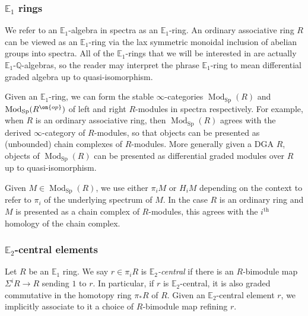 \documentclass[12 pt]{amsart}
\theoremstyle{plain}
\theoremstyle{definition}
\theoremstyle{remark}
\numberwithin{equation}{section}
\DeclareMathOperator\Sp{Sp}
\DeclareMathOperator\Pro{Pro}
\DeclareMathOperator\Mod{Mod}
\newcommand\QQ{\mathbb{Q}}
\newcommand\ZZ{\mathbb{Z}}
\newcommand\EE{\mathbb{E}}
\begin{document}
\subsubsection{$\EE_1$ rings}
We refer to an $\EE_1$-algebra in spectra as an $\EE_1$-ring. An ordinary associative ring $R$ can be viewed as an $\EE_1$-ring via the lax symmetric monoidal inclusion of abelian groups into spectra. All of the $\EE_1$-rings that we will be interested in are actually $\EE_1$-$\QQ$-algebras, so the reader may interpret the phrase $\EE_1$-ring to mean differential graded algebra up to quasi-isomorphism.

Given an $\EE_1$-ring, we can form the stable $\infty$-categories $\Mod_{\Sp}(R)$ and
$\Mod_{\Sp}(R^{\on{op}})$ 
of left and right $R$-modules in spectra respectively. %
For example, when $R$ is an ordinary associative ring, then $\Mod_{\Sp}(R)$ agrees with the derived $\infty$-category of $R$-modules, so that objects can be presented as (unbounded) chain complexes of $R$-modules. More generally given a DGA $R$, objects of $\Mod_{\Sp}(R)$ can be presented as differential graded modules over $R$ up to quasi-isomorphism.

Given $M \in \Mod_{\Sp}(R)$, we use either $\pi_iM$ or $H_iM$ depending on the context to refer to $\pi_i$ of the underlying spectrum of $M$. In the case $R$ is an ordinary ring and $M$ is presented as a chain complex of $R$-modules, this agrees with the $i^{\mathrm{th}}$ homology of the chain complex.%

\subsubsection{$\EE_2$-central elements}
Let $R$ be an $\EE_1$ ring.
We say $r \in \pi_iR$ is {\em $\EE_2$-central} if there is an $R$-bimodule map $\Sigma^iR \to R$ sending $1$ to $r$. %
In particular, if $r$ is $\EE_2$-central, it is also graded commutative in the homotopy ring $\pi_*R$ of $R$. 
Given an $\EE_2$-central element $r$, we implicitly associate to it a choice of $R$-bimodule map refining $r$.
\end{document}
